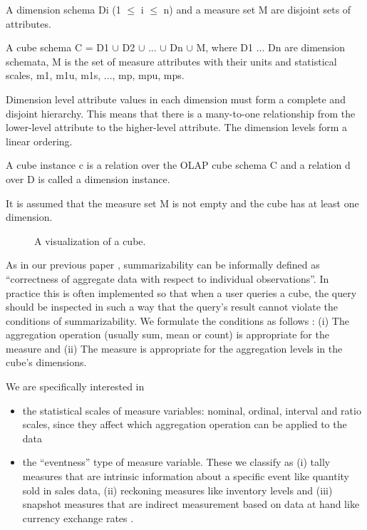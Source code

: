 \documentclass[USenglish,twocolumn]{article}
\begin{document}
A dimension schema Di (1 $\leq$ i $\leq$ n) and a measure set M are disjoint sets
of attributes.

A cube schema C = D1 $\cup$ D2 $\cup$ ... $\cup$ Dn $\cup$ M, where D1 ... Dn are dimension
schemata, M is the set of measure attributes with their units and
statistical scales, m1, m1u, m1s, ..., mp, mpu, mps.

Dimension level attribute values in each dimension must form a complete
and disjoint hierarchy. This means that there is a many-to-one
relationship from the lower-level attribute to the higher-level
attribute. The dimension levels form a linear ordering.

A cube instance c is a relation over the OLAP cube schema C and a
relation d over D is called a dimension instance.

It is assumed that the measure set M is not empty and the cube has at
least one dimension.

\begin{figure}
\caption{A visualization of a cube.\label{fig1}}
\end{figure}

As in our previous paper \cite{Nii181}, summarizability can be informally defined as
``correctness of aggregate data with respect to individual
observations''. In practice this is often implemented so that when a
user queries a cube, the query should be inspected in such a way that
the query's result cannot violate the conditions of summarizability. We
formulate the conditions as follows \cite{Tap14}: (i) The aggregation operation
(usually sum, mean or count) is appropriate for the measure and (ii) The
measure is appropriate for the aggregation levels in the cube's
dimensions.

We are specifically interested in

\begin{itemize}
\item
  the statistical scales of measure variables: nominal, ordinal,
  interval and ratio scales, since they affect which aggregation
  operation can be applied to the data
\item
  the ``eventness'' type of measure variable. These we classify as (i)
  tally measures that are intrinsic information about a specific event
  like quantity sold in sales data, (ii) reckoning measures like
  inventory levels and (iii) snapshot measures that are indirect
  measurement based on data at hand like currency exchange rates \cite{Tap14}.
\end{itemize}
\end{document}
